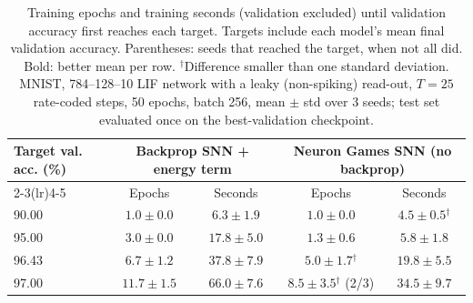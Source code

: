\documentclass{article}
\begin{document}
\begin{table}[H]
\centering
\small
\caption{Training epochs and training seconds (validation excluded) until validation accuracy first reaches each target. Targets include each model's mean final validation accuracy. Parentheses: seeds that reached the target, when not all did. Bold: better mean per row. $^\dagger$Difference smaller than one standard deviation. MNIST, 784--128--10 LIF network with a leaky (non-spiking) read-out, $T=25$ rate-coded steps, 50 epochs, batch 256, mean $\pm$ std over 3 seeds; test set evaluated once on the best-validation checkpoint.}
\label{tab:t2-time-to-accuracy}
\begin{tabular}{lcccc}
\toprule
\multirow{2}{*}{Target val. acc. (\%)} & \multicolumn{2}{c}{Backprop SNN + energy term} & \multicolumn{2}{c}{Neuron Games SNN (no backprop)} \\
\cmidrule(lr){2-3}\cmidrule(lr){4-5}
 & Epochs & Seconds & Epochs & Seconds \\
\midrule
90.00 & $1.0 \pm 0.0$ & $6.3 \pm 1.9$ & $1.0 \pm 0.0$ & $\boldsymbol{4.5 \pm 0.5}$$^\dagger$ \\
95.00 & $3.0 \pm 0.0$ & $17.8 \pm 5.0$ & $\boldsymbol{1.3 \pm 0.6}$ & $\boldsymbol{5.8 \pm 1.8}$ \\
96.43 & $6.7 \pm 1.2$ & $37.8 \pm 7.9$ & $\boldsymbol{5.0 \pm 1.7}$$^\dagger$ & $\boldsymbol{19.8 \pm 5.5}$ \\
97.00 & $11.7 \pm 1.5$ & $66.0 \pm 7.6$ & $\boldsymbol{8.5 \pm 3.5}$$^\dagger$ (2/3) & $\boldsymbol{34.5 \pm 9.7}$ \\
\bottomrule
\end{tabular}
\end{table}
\end{document}
